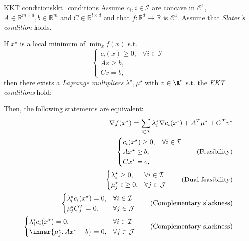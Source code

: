 \begin{theorem}{KKT conditions}{kkt_conditions}
	Assume \(c_i, i \in \mathcal{I}\) are concave in \(\mathcal{C}^1\),
	\(A\in \mathbb{R}^{m \times d}, b \in \mathbb{R}^m\) and \(C\in \mathbb{R}^{l \times d}\) and that \(f:\mathbb{R}^d \to \mathbb{R}\) is \(\mathcal{C}^1\). Assume that \emph{Slater's condition} holds.

	If \(x^\star\) is a local minimum of \(\min_x f(x)\) s.t.
	\[
		\begin{cases}
			c_i(x) \geq 0, & \forall i \in \mathcal{I} \\
			Ax \geq b,     &                           \\
			Cx = b,        &
		\end{cases}
	\]
	then there exists a \emph{Lagrange multipliers} \(\lambda^\star, \mu^\star\) with \(v \in \R^e\) s.t. the \emph{KKT conditions} hold:

	Then, the following statements are equivalent:
	\begin{align}
		\nabla f(x^\star) = \sum_{i\in \mathcal{I}} \lambda_i^\star \nabla c_i(x^\star) + A^T \mu^\star + C^T v^\star \\
		\begin{cases}
			c_i(x^\star) \geq 0, & \forall i \in \mathcal{I} \\
			Ax^\star \geq b,     &                           \\
			Cx^\star = e,        &                           \\
		\end{cases} \tag{Feasibility}                                                              \\
		\begin{cases}
			\lambda_i^\star \geq 0, & \forall i \in \mathcal{I} \\
			\mu_j^\star \in \geq 0, & \forall j \in \mathcal{J} \\
		\end{cases} \tag{Dual feasibility}                                                           \\
		\begin{cases}
			\lambda_i^\star c_i(x^\star) = 0, & \forall i \in \mathcal{I} \\
			\mu_j^\star C_j^T = 0,            & \forall j \in \mathcal{J} \\
		\end{cases} \tag{Complementary slackness}                                                 \\
		\begin{cases}
			\lambda_i^\star c_i(x^\star) = 0,      & \forall i \in \mathcal{I} \\
			\inner{\mu_j^\star, Ax^\star - b} = 0, & \forall j \in \mathcal{J} \\
		\end{cases} \tag{Complementary slackness}
	\end{align}
\end{theorem}

